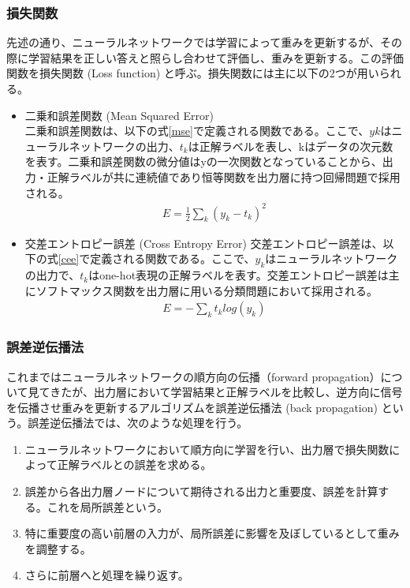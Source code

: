 \subsubsection{損失関数}
先述の通り、ニューラルネットワークでは学習によって重みを更新するが、その際に学習結果を正しい答えと照らし合わせて評価し、重みを更新する。この評価関数を損失関数 (Loss function) と呼ぶ。損失関数には主に以下の2つが用いられる。
\begin{itemize}
	\item 二乗和誤差関数  (Mean Squared Error) \\
		二乗和誤差関数は、以下の式\ref{mse}で定義される関数である。ここで、$yk$はニューラルネットワークの出力、$t_k$は正解ラベルを表し、kはデータの次元数を表す。二乗和誤差関数の微分値はyの一次関数となっていることから、出力・正解ラベルが共に連続値であり恒等関数を出力層に持つ回帰問題で採用される。
		\begin{align}
			\label{mse}
			E = \frac{1}{2}\sum_k {(y_k-t_k)}^2
		\end{align}
	\item 交差エントロピー誤差 (Cross Entropy Error) 
		交差エントロピー誤差は、以下の式\ref{cee}で定義される関数である。ここで、$y_k$はニューラルネットワークの出力で、$t_k$はone-hot表現の正解ラベルを表す。交差エントロピー誤差は主にソフトマックス関数を出力層に用いる分類問題において採用される。
		\begin{align}
			\label{cee}
			E = - \sum_k t_k log(y_k)
		\end{align}
\end{itemize}

\subsubsection{誤差逆伝播法}
これまではニューラルネットワークの順方向の伝播（forward propagation）について見てきたが、出力層において学習結果と正解ラベルを比較し、逆方向に信号を伝播させ重みを更新するアルゴリズムを誤差逆伝播法 (back propagation) という。誤差逆伝播法では、次のような処理を行う。
\begin{enumerate}
	\item ニューラルネットワークにおいて順方向に学習を行い、出力層で損失関数によって正解ラベルとの誤差を求める。
	\item 誤差から各出力層ノードについて期待される出力と重要度、誤差を計算する。これを局所誤差という。
	\item 特に重要度の高い前層の入力が、局所誤差に影響を及ぼしているとして重みを調整する。
	\item さらに前層へと処理を繰り返す。
\end{enumerate}
